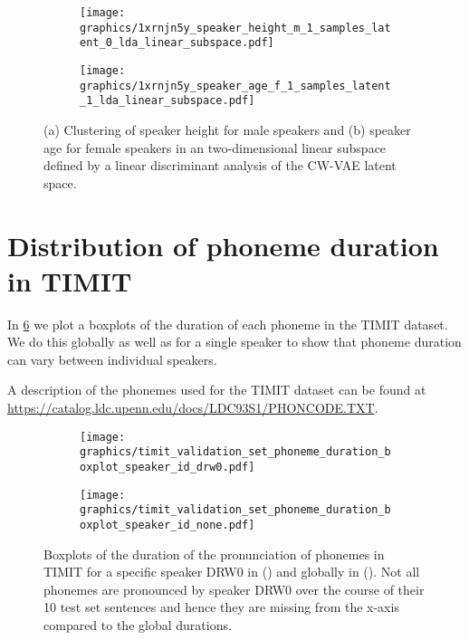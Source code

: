 \begin{figure}[t!]
     \centering
     \hfill
     \begin{subfigure}[b]{0.48\textwidth}
         \centering
         \texttt{[image: graphics/1xrnjn5y\_speaker\_height\_m\_1\_samples\_latent\_0\_lda\_linear\_subspace.pdf]}
         \caption{}
         \label{fig: cwvae latent z1 height}
     \end{subfigure}
     \hfill
     \begin{subfigure}[b]{0.48\textwidth}
         \centering
         \texttt{[image: graphics/1xrnjn5y\_speaker\_age\_f\_1\_samples\_latent\_1\_lda\_linear\_subspace.pdf]}
         \caption{}
         \label{fig: cwvae latent z0 age}
     \end{subfigure}
    \caption{(a) Clustering of speaker height for male speakers and (b) speaker age for female speakers in an two-dimensional linear subspace defined by a linear discriminant analysis of the CW-VAE latent space.}
    \label{fig: cwvae latent height}
\end{figure}




\section{Distribution of phoneme duration in TIMIT}\label{app: timit phoneme distributions}
In \cref{fig: timit validation set phoneme duration} we plot a boxplots of the duration of each phoneme in the TIMIT dataset. We do this globally as well as for a single speaker to show that phoneme duration can vary between individual speakers. 

A description of the phonemes used for the TIMIT dataset can be found at \url{https://catalog.ldc.upenn.edu/docs/LDC93S1/PHONCODE.TXT}.

\begin{figure}[t!]
    \centering
    \hfill
    \begin{subfigure}[b]{\textwidth}
        \centering
        \texttt{[image: graphics/timit\_validation\_set\_phoneme\_duration\_boxplot\_speaker\_id\_drw0.pdf]}
        \caption{}
        \label{fig: timit validation set phoneme duration DRW0}
    \end{subfigure}
    \begin{subfigure}[b]{\textwidth}
        \centering
        \texttt{[image: graphics/timit\_validation\_set\_phoneme\_duration\_boxplot\_speaker\_id\_none.pdf]}
        \caption{}
        \label{fig: timit validation set phoneme duration global}
    \end{subfigure}
    \caption{Boxplots of the duration of the pronunciation of phonemes in TIMIT for a specific speaker DRW0 in () and globally in (). Not all phonemes are pronounced by speaker DRW0 over the course of their 10 test set sentences and hence they are missing from the x-axis compared to the global durations.}
    \label{fig: timit validation set phoneme duration}
\end{figure}

